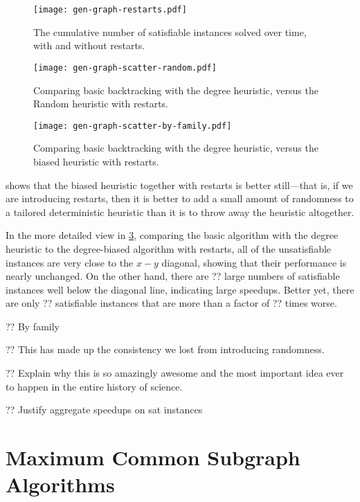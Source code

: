 \documentclass{article}
\begin{document}
\begin{figure}[p]
    \centering
    \texttt{[image: gen-graph-restarts.pdf]}

    \caption{The cumulative number of satisfiable instances solved over time, with and without
    restarts.}
    \label{figure:restarts}
\end{figure}

\begin{figure}[p]
    \centering
    \texttt{[image: gen-graph-scatter-random.pdf]}
    \caption{Comparing basic backtracking with the degree heuristic, versus the Random heuristic
    with restarts.}
    \label{figure:scatter-random}
\end{figure}

\begin{figure}[p]
    \centering
    \texttt{[image: gen-graph-scatter-by-family.pdf]}

    \caption{Comparing basic backtracking with the degree heuristic, versus the biased
    heuristic with restarts.}
    \label{figure:scatter-by-family}
\end{figure}

 shows that the biased heuristic together with restarts is better still---that
is, if we are introducing restarts, then it is better to add a small amount of randomness to a
tailored deterministic heuristic than it is to throw away the heuristic altogether.

In the more detailed view in \cref{figure:scatter-by-family}, comparing the basic algorithm with the
degree heuristic to the degree-biased algorithm with restarts, all of the unsatisfiable instances
are very close to the $x-y$ diagonal, showing that their performance is nearly unchanged. On the
other hand, there are ?? large numbers of satisfiable instances well below the diagonal line,
indicating large speedups.  Better yet, there are only ?? satisfiable instances that are more than a
factor of ?? times worse.

?? By family

?? This has made up the consistency we lost from introducing randomness.

?? Explain why this is so amazingly awesome and the most important idea ever to happen in the entire
history of science.

?? Justify aggregate speedups on sat instances

\section{Maximum Common Subgraph Algorithms}
\end{document}
